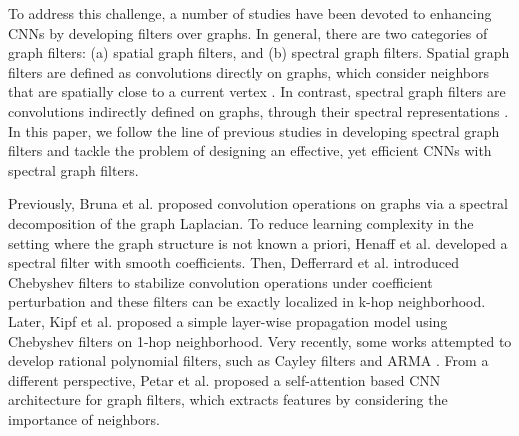 \documentclass{article}
\begin{document}
To address this challenge, a number of studies have been devoted to enhancing CNNs by developing filters over graphs. In general, there are two categories of graph filters: (a) spatial graph filters, and (b) spectral graph filters. Spatial graph filters are defined as convolutions directly on graphs, which consider neighbors that are spatially close to a current vertex \cite{atwood2016diffusion, duvenaud2015convolutional, hamilton2017inductive}. In contrast, spectral graph filters are convolutions indirectly defined on graphs, through their spectral representations \cite{bruna2013spectral,chung1997spectral,defferrard2016convolutional}. In this paper, we follow the line of previous studies in developing spectral graph filters and tackle the problem of designing an effective, yet efficient CNNs with spectral graph filters.

Previously, Bruna et al. \cite{bruna2013spectral} proposed convolution operations on graphs via a spectral decomposition of the graph Laplacian. To reduce learning complexity in the setting where the graph structure is not known a priori, Henaff et al. \cite{henaff2015deep} developed a spectral filter with smooth coefficients. Then, Defferrard et al. \cite{defferrard2016convolutional} introduced Chebyshev filters to stabilize convolution operations under coefficient perturbation and these filters can be exactly localized in k-hop neighborhood. Later, Kipf et al. \cite{kipf2016semi} proposed a simple layer-wise propagation model using Chebyshev filters on 1-hop neighborhood. Very recently, some works attempted to develop rational polynomial filters, such as Cayley filters \cite{levie2017cayleynets} and ARMA \cite{bianchi2019graph}. From a different perspective, Petar et al. \cite{velivckovic2017graph} proposed a self-attention based CNN architecture for  graph filters, which extracts features by considering the importance of neighbors. 
\end{document}
